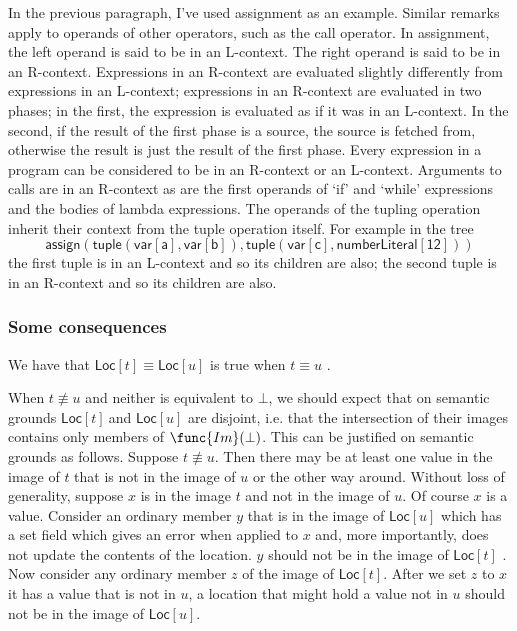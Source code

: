 \documentclass[12pt]{article}
\begin{document}
In the previous paragraph, I've used assignment as an example. Similar
remarks apply to operands of other operators, such as the call operator. In
assignment, the left operand is said to be in an L-context. The right
operand is said to be in an R-context. Expressions in an R-context are
evaluated slightly differently from expressions in an L-context; expressions
in an R-context are evaluated in two phases; in the first, the expression is
evaluated as if it was in an L-context. In the second, if the result of the
first phase is a source, the source is fetched from, otherwise the result is
just the result of the first phase. Every expression in a program can be
considered to be in an R-context or an L-context. Arguments to calls are in
an R-context as are the first operands of `if' and `while' expressions and
the bodies of lambda expressions. The operands of the tupling operation
inherit their context from the tuple operation itself. For example in the
tree%
\begin{equation*}
\mathsf{assign(tuple(var[a],var[b]),tuple(var[c],numberLiteral[12]))}
\end{equation*}%
the first tuple is in an L-context and so its children are also; the second
tuple is in an R-context and so its children are also.

\subsubsection{Some consequences}

We have that $\mathsf{Loc}[t]\equiv \mathsf{Loc}[u]$ is true when $t\equiv u$%
.

When $t\not\equiv u$ and neither is equivalent to $\bot $, we should expect
that on semantic grounds $\mathsf{Loc}[t]\ $and $\mathsf{Loc}[u]$ are
disjoint, i.e. that the intersection of their images contains only members
of $\func{Im}(\bot )$. This can be justified on semantic grounds as follows.
Suppose $t\not\equiv u$. Then there may be at least one value in the image
of $t$ that is not in the image of $u$ or the other way around. Without loss
of generality, suppose $x$ is in the image $t$ and not in the image of $u$.
Of course $x$ is a value. Consider an ordinary member $y$ that is in the
image of $\mathsf{Loc}\left[ u\right] $ which has a set field which gives an
error when applied to $x$ and, more importantly, does not update the
contents of the location. $y$ should not be in the image of $\mathsf{Loc}[t]$%
. Now consider any ordinary member $z$ of the image of $\mathsf{Loc}[t]$.
After we set $z$ to $x$ it has a value that is not in $u$, a location that
might hold a value not in $u$ should not be in the image of $\mathsf{Loc}%
\left[ u\right] $.
\end{document}
